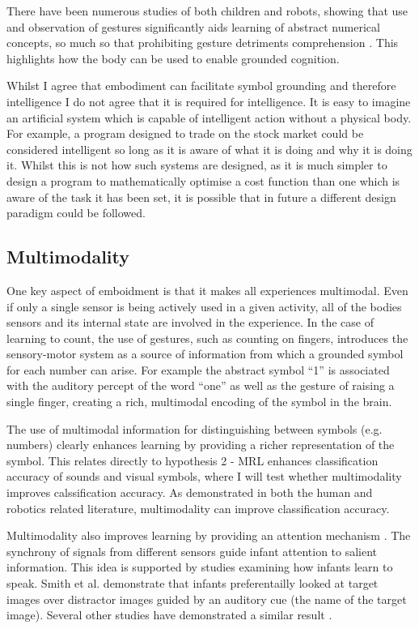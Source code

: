 There have been numerous studies of both children and robots, showing that use and observation of gestures significantly aids learning of abstract numerical concepts, so much so that prohibiting gesture detriments comprehension \cite{Goldin-MeadowSusan2015Fata, de2014making, rucinski2012robotic}. This highlights how the body can be used to enable grounded cognition.

Whilst I agree that embodiment can facilitate symbol grounding and therefore intelligence I do not agree that it is required for intelligence. It is easy to imagine an artificial system which is capable of intelligent action without a physical body. For example, a program designed to trade on the stock market could be considered intelligent so long as it is aware of what it is doing and why it is doing it. Whilst this is not how such systems are designed, as it is much simpler to design a program to mathematically optimise a cost function than one which is aware of the task it has been set, it is possible that in future a different design paradigm could be followed.

\subsection{Multimodality}
One key aspect of emboidment is that it makes all experiences multimodal. Even if only a single sensor is being actively used in a given activity, all of the bodies sensors and its internal state are involved in the experience. 
In the case of learning to count, the use of gestures, such as counting on fingers, introduces the sensory-motor system as a source of information from which a grounded symbol for each number can arise. For example the abstract symbol ``1'' is associated with the auditory percept of the word ``one'' as well as the gesture of raising a single finger, creating a rich, multimodal encoding of the symbol in the brain.

The use of multimodal information for distinguishing between symbols (e.g. numbers) clearly enhances learning by providing a richer representation of the symbol. This relates directly to hypothesis 2 - \ac{MRL} enhances classification accuracy of sounds and visual symbols, where I will test whether multimodality improves calssification accuracy. As demonstrated in both the human and robotics related literature, multimodality can improve classification accuracy.

Multimodality also improves learning by providing an attention mechanism \cite{bahrick2000intersensory}. The synchrony of signals from different sensors guide infant attention to salient information. This idea is supported by studies examining how infants learn to speak.  Smith et al. \cite{smith2008infants} demonstrate that infants preferentailly looked at target images over distractor images guided by an auditory cue (the name of the target image). Several other studies have demonstrated a similar result \cite{walker2010preverbal, fischer2011multi, scott20122, slater1999intermodal}.

